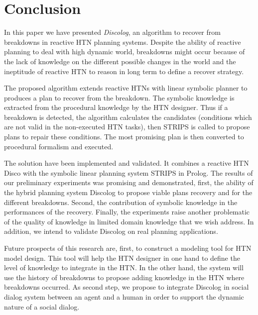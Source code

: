 \documentclass[conference]{IEEEtran}
\begin{document}
	\section{Conclusion}
	\par In this paper we have presented \emph{Discolog}, an algorithm to recover from breakdowns in reactive HTN planning systems.  Despite the ability of reactive planning  to deal with high dynamic world,  breakdowns might occur because of the lack of knowledge on the different possible changes in the world and the ineptitude  of reactive HTN to reason in long term to define a recover strategy. 
	\par The proposed algorithm extends reactive HTNs with linear symbolic planner to produces a plan to recover from the breakdown. The symbolic knowledge is extracted from the procedural knowledge by the HTN designer. Thus if a breakdown is detected, the algorithm calculates the candidates (conditions which are not valid in the non-executed HTN tasks), then 
	STRIPS is called to propose plans to repair these conditions. The most promising plan is then converted to procedural formalism and executed. 
	\par The solution have been implemented and validated. It combines a reactive HTN Disco with the symbolic linear planning system STRIPS in Prolog.  The
	results of our preliminary experiments was promising and demonstrated, first, the ability of the hybrid planning system Discolog to propose viable plans recovery and for the different breakdowns. Second, the  contribution of symbolic knowledge in the performances of the recovery. Finally, the experiments raise another problematic of the quality of  knowledge in limited domain knowledge that we wish address. In addition, we intend to validate Discolog on real planning applications.  
	\par Future prospects of this research are, first, to construct a modeling tool for HTN	model design. This tool will help the HTN designer in one hand to define the level of knowledge to integrate in the HTN. In the other hand, the system will use the history of breakdowns to propose adding knowledge in the HTN where breakdowns occurred. As second step, we propose to integrate Discolog in social dialog system between an agent and a human in order to support the dynamic nature of a social dialog.
	
\end{document}
